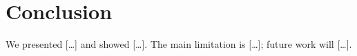 \section{Conclusion}\label{sec:conclusion}

We presented [\dots] and showed [\dots].
The main limitation is [\dots]; future work will [\dots].
